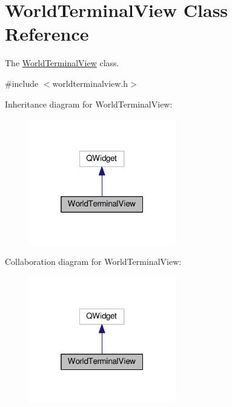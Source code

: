 \hypertarget{classWorldTerminalView}{}\section{World\+Terminal\+View Class Reference}
\label{classWorldTerminalView}


The \hyperlink{classWorldTerminalView}{World\+Terminal\+View} class.  




{\ttfamily \#include $<$worldterminalview.\+h$>$}



Inheritance diagram for World\+Terminal\+View\+:
\nopagebreak
\begin{figure}[H]
\begin{center}
\leavevmode
\includegraphics[width=181pt]{d8/da5/classWorldTerminalView__inherit__graph}
\end{center}
\end{figure}


Collaboration diagram for World\+Terminal\+View\+:
\nopagebreak
\begin{figure}[H]
\begin{center}
\leavevmode
\includegraphics[width=181pt]{df/d82/classWorldTerminalView__coll__graph}
\end{center}
\end{figure}
